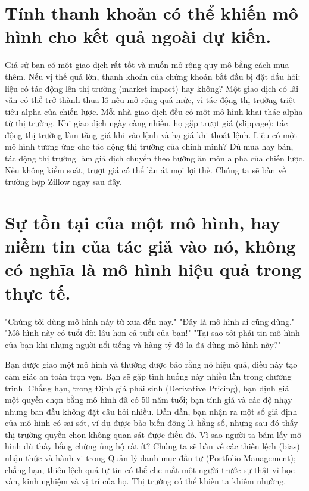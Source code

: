 \section{Tính thanh khoản có thể khiến mô hình cho kết quả ngoài dự kiến.}

Giả sử bạn có một giao dịch rất tốt và muốn mở rộng quy mô bằng cách mua thêm. Nếu vị thế quá lớn, thanh khoản của chứng khoán bắt đầu bị đặt dấu hỏi: liệu có tác động lên thị trường (market impact) hay không? Một giao dịch có lãi vẫn có thể trở thành thua lỗ nếu mở rộng quá mức, vì tác động thị trường triệt tiêu alpha của chiến lược. Mỗi nhà giao dịch đều có một mô hình khai thác alpha từ thị trường. Khi giao dịch ngày càng nhiều, họ gặp trượt giá (slippage): tác động thị trường làm tăng giá khi vào lệnh và hạ giá khi thoát lệnh. Liệu có một mô hình tương ứng cho tác động thị trường của chính mình? Dù mua hay bán, tác động thị trường làm giá dịch chuyển theo hướng ăn mòn alpha của chiến lược. Nếu không kiểm soát, trượt giá có thể lấn át mọi lợi thế. Chúng ta sẽ bàn về trường hợp Zillow ngay sau đây.

\section{Sự tồn tại của một mô hình, hay niềm tin của tác giả vào nó, không có nghĩa là mô hình hiệu quả trong thực tế.}

"Chúng tôi dùng mô hình này từ xưa đến nay." "Đây là mô hình ai cũng dùng." "Mô hình này có tuổi đời lâu hơn cả tuổi của bạn!" "Tại sao tôi phải tin mô hình của bạn khi những người nổi tiếng và hàng tỷ đô la đã dùng mô hình này?"

Bạn được giao một mô hình và thường được bảo rằng nó hiệu quả, điều này tạo cảm giác an toàn trọn vẹn. Bạn sẽ gặp tình huống này nhiều lần trong chương trình. Chẳng hạn, trong Định giá phái sinh (Derivative Pricing), bạn định giá một quyền chọn bằng mô hình đã có 50 năm tuổi; bạn tính giá và các độ nhạy nhưng ban đầu không đặt câu hỏi nhiều. Dần dần, bạn nhận ra một số giả định của mô hình có sai sót, ví dụ được bảo biến động là hằng số, nhưng sau đó thấy thị trường quyền chọn không quan sát được điều đó. Vì sao người ta bám lấy mô hình dù thấy bằng chứng ủng hộ rất ít? Chúng ta sẽ bàn về các thiên lệch (bias) nhận thức và hành vi trong Quản lý danh mục đầu tư (Portfolio Management); chẳng hạn, thiên lệch quá tự tin có thể che mắt một người trước sự thật vì học vấn, kinh nghiệm và vị trí của họ. Thị trường có thể khiến ta khiêm nhường.

